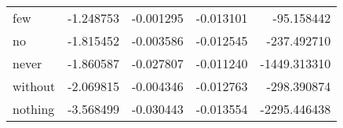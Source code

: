 \begin{table}[ht]
\begin{tabular}{lrrrr}
few & {\cellcolor[HTML]{CFE4EF}} \color[HTML]{000000} -1.248753 & {\cellcolor[HTML]{71B0D3}} \color[HTML]{F1F1F1} -0.001295 & {\cellcolor[HTML]{09386D}} \color[HTML]{F1F1F1} -0.013101 & {\cellcolor[HTML]{9BC9E0}} \color[HTML]{000000} -95.158442 \\
no & {\cellcolor[HTML]{93C6DE}} \color[HTML]{000000} -1.815452 & {\cellcolor[HTML]{62A7CE}} \color[HTML]{F1F1F1} -0.003586 & {\cellcolor[HTML]{0F437B}} \color[HTML]{F1F1F1} -0.012545 & {\cellcolor[HTML]{8DC2DC}} \color[HTML]{000000} -237.492710 \\
never & {\cellcolor[HTML]{8DC2DC}} \color[HTML]{000000} -1.860587 & {\cellcolor[HTML]{0C3D73}} \color[HTML]{F1F1F1} -0.027807 & {\cellcolor[HTML]{1D5FA2}} \color[HTML]{F1F1F1} -0.011240 & {\cellcolor[HTML]{2870B1}} \color[HTML]{F1F1F1} -1449.313310 \\
without & {\cellcolor[HTML]{6EAED2}} \color[HTML]{F1F1F1} -2.069815 & {\cellcolor[HTML]{5CA3CB}} \color[HTML]{F1F1F1} -0.004346 & {\cellcolor[HTML]{0D3F76}} \color[HTML]{F1F1F1} -0.012763 & {\cellcolor[HTML]{87BEDA}} \color[HTML]{000000} -298.390874 \\
nothing & {\cellcolor[HTML]{053061}} \color[HTML]{F1F1F1} -3.568499 & {\cellcolor[HTML]{053061}} \color[HTML]{F1F1F1} -0.030443 & {\cellcolor[HTML]{053061}} \color[HTML]{F1F1F1} -0.013554 & {\cellcolor[HTML]{053061}} \color[HTML]{F1F1F1} -2295.446438 \\
\bottomrule
\end{tabular}
\end{table}

